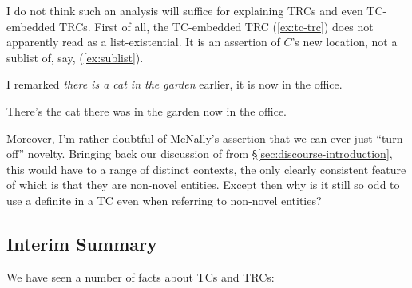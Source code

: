 \documentclass[11pt]{article}
\begin{document}
I do not think such an analysis will suffice for explaining TRCs and even TC-embedded TRCs. First of all, the TC-embedded TRC (\ref{ex:tc-trc}) does not apparently read as a list-existential. It is an assertion of \(C\)'s new location, not a sublist of, say, (\ref{ex:sublist}).

\begin{resexe}
	\item[\textit{Context.}] I remarked \textit{there is a cat in the garden} earlier, it is now in the office.
	\item[(\ref{ex:tc-trc})] There's the cat there was in the garden now in the office.
\end{resexe}

\begin{exe}
	\label{ex:sublist}
\end{exe}

Moreover, I'm rather doubtful of McNally's assertion that we can ever just ``turn off'' novelty. Bringing back our discussion of \citet{abbottDefinitenessExistentials1997} from \S\ref{sec:discourse-introduction}, this would have to a range of distinct contexts, the only clearly consistent feature of which is that they are non-novel entities. Except then why is it still so odd to use a definite in a TC even when referring to non-novel entities?

\begin{exe}
\end{exe}

\subsection{Interim Summary}
We have seen a number of facts about TCs and TRCs:
\end{document}
